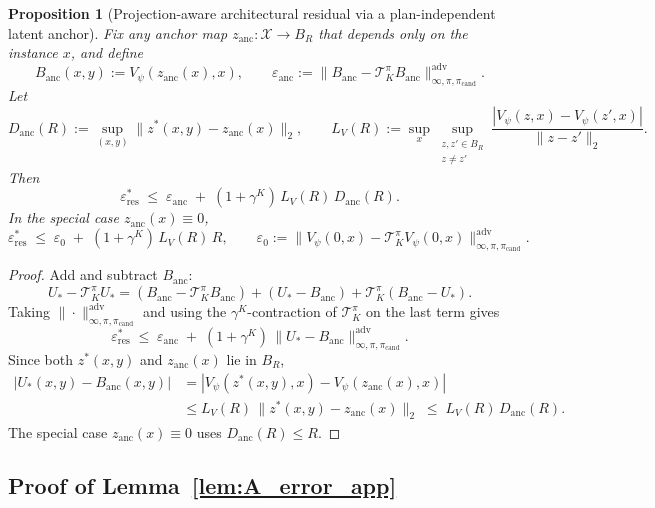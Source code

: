 \documentclass{article}
\theoremstyle{plain}
\newtheorem{proposition}[theorem]{Proposition}
\theoremstyle{definition}
\theoremstyle{remark}
\newcommand{\XX}{\mathcal{X}}
\begin{document}
\begin{proposition}[Projection-aware architectural residual via a plan-independent latent anchor]
\label{prop:proj_residual_anchor}
Fix any anchor map $z_{\mathrm{anc}}:\XX\to B_R$ that depends only on the instance $x$, and define
\[
B_{\mathrm{anc}}(x,y):=V_\psi(z_{\mathrm{anc}}(x),x),
\qquad
\varepsilon_{\mathrm{anc}}
:=
\|B_{\mathrm{anc}}-\mathcal{T}_K^\pi B_{\mathrm{anc}}\|_{\infty,\pi,\pi_{\mathrm{cand}}}^{\mathrm{adv}}.
\]
Let
\[
D_{\mathrm{anc}}(R)
:=
\sup_{(x,y)}\|z^*(x,y)-z_{\mathrm{anc}}(x)\|_2,
\qquad
L_V(R)
:=
\sup_x\sup_{\substack{z,z'\in B_R\\ z\neq z'}}
\frac{|V_\psi(z,x)-V_\psi(z',x)|}{\|z-z'\|_2}.
\]
Then
\begin{equation}
\varepsilon_{\mathrm{res}}^*
\;\le\;
\varepsilon_{\mathrm{anc}}
\;+\;
(1+\gamma^K)\,L_V(R)\,D_{\mathrm{anc}}(R).
\label{eq:eps_res_anchor}
\end{equation}
In the special case $z_{\mathrm{anc}}(x)\equiv 0$,
\[
\varepsilon_{\mathrm{res}}^*
\;\le\;
\varepsilon_{0}
\;+\;
(1+\gamma^K)\,L_V(R)\,R,
\qquad
\varepsilon_0
:=
\|V_\psi(0,x)-\mathcal{T}_K^\pi V_\psi(0,x)\|_{\infty,\pi,\pi_{\mathrm{cand}}}^{\mathrm{adv}}.
\]
\end{proposition}

\begin{proof}
Add and subtract $B_{\mathrm{anc}}$:
\[
U_*-\mathcal{T}_K^\pi U_*
=
(B_{\mathrm{anc}}-\mathcal{T}_K^\pi B_{\mathrm{anc}})
+
(U_*-B_{\mathrm{anc}})
+
\mathcal{T}_K^\pi(B_{\mathrm{anc}}-U_*).
\]
Taking $\|\cdot\|_{\infty,\pi,\pi_{\mathrm{cand}}}^{\mathrm{adv}}$ and using the
$\gamma^K$-contraction of $\mathcal{T}_K^\pi$ on the last term gives
\[
\varepsilon_{\mathrm{res}}^*
\;\le\;
\varepsilon_{\mathrm{anc}}
\;+\;
(1+\gamma^K)\,\|U_*-B_{\mathrm{anc}}\|_{\infty,\pi,\pi_{\mathrm{cand}}}^{\mathrm{adv}}.
\]
Since both $z^*(x,y)$ and $z_{\mathrm{anc}}(x)$ lie in $B_R$,
\begin{align*}
|U_*(x,y)-B_{\mathrm{anc}}(x,y)|
&=
|V_\psi(z^*(x,y),x)-V_\psi(z_{\mathrm{anc}}(x),x)| \\
&\le
L_V(R)\,\|z^*(x,y)-z_{\mathrm{anc}}(x)\|_2
\;\le\;
L_V(R)\,D_{\mathrm{anc}}(R).
\end{align*}
The special case $z_{\mathrm{anc}}(x)\equiv 0$ uses $D_{\mathrm{anc}}(R)\le R$.
\end{proof}


\subsection{Proof of Lemma~\ref{lem:A_error_app}}
\end{document}
